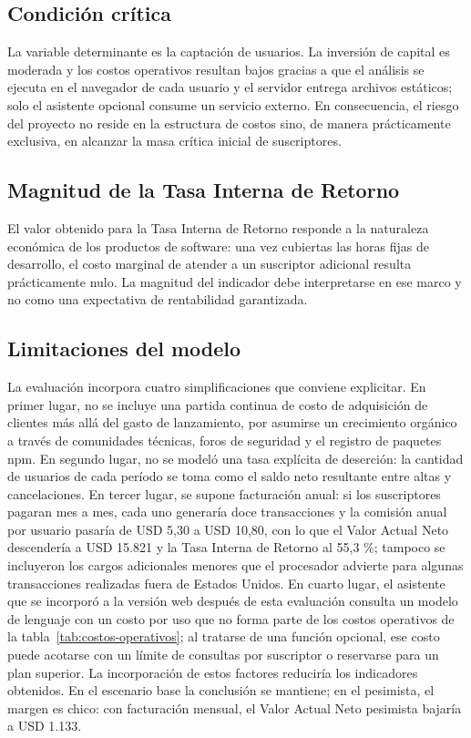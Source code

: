 \subsection{Condición crítica}\label{sec:n5.8.1}

La variable determinante es la captación de usuarios. La inversión de capital es moderada y los costos operativos resultan bajos gracias a que el análisis se ejecuta en el navegador de cada usuario y el servidor entrega archivos estáticos; solo el asistente opcional consume un servicio externo. En consecuencia, el riesgo del proyecto no reside en la estructura de costos sino, de manera prácticamente exclusiva, en alcanzar la masa crítica inicial de suscriptores.

\subsection{Magnitud de la Tasa Interna de Retorno}\label{sec:n5.8.2}

El valor obtenido para la Tasa Interna de Retorno responde a la naturaleza económica de los productos de software: una vez cubiertas las horas fijas de desarrollo, el costo marginal de atender a un suscriptor adicional resulta prácticamente nulo. La magnitud del indicador debe interpretarse en ese marco y no como una expectativa de rentabilidad garantizada.

\subsection{Limitaciones del modelo}\label{sec:n5.8.3}

La evaluación incorpora cuatro simplificaciones que conviene explicitar. En primer lugar, no se incluye una partida continua de costo de adquisición de clientes más allá del gasto de lanzamiento, por asumirse un crecimiento orgánico a través de comunidades técnicas, foros de seguridad y el registro de paquetes npm. En segundo lugar, no se modeló una tasa explícita de deserción: la cantidad de usuarios de cada período se toma como el saldo neto resultante entre altas y cancelaciones. En tercer lugar, se supone facturación anual: si los suscriptores pagaran mes a mes, cada uno generaría doce transacciones y la comisión anual por usuario pasaría de USD 5,30 a USD 10,80, con lo que el Valor Actual Neto descendería a USD 15.821 y la Tasa Interna de Retorno al 55,3 \%; tampoco se incluyeron los cargos adicionales menores que el procesador advierte para algunas transacciones realizadas fuera de Estados Unidos. En cuarto lugar, el asistente que se incorporó a la versión web después de esta evaluación consulta un modelo de lenguaje con un costo por uso que no forma parte de los costos operativos de la tabla~\ref{tab:costos-operativos}; al tratarse de una función opcional, ese costo puede acotarse con un límite de consultas por suscriptor o reservarse para un plan superior. La incorporación de estos factores reduciría los indicadores obtenidos. En el escenario base la conclusión se mantiene; en el pesimista, el margen es chico: con facturación mensual, el Valor Actual Neto pesimista bajaría a USD 1.133.

